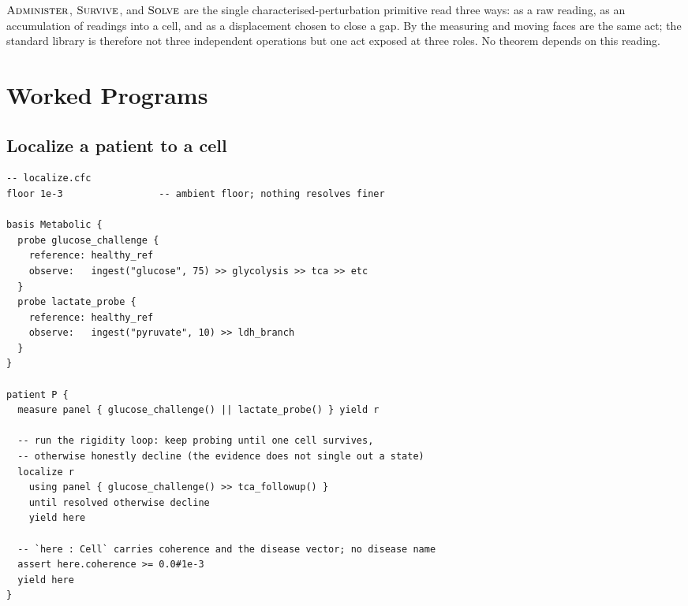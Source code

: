 \begin{remark}
\label{cfc:rem:one-primitive}
$\textsc{Administer}$, $\textsc{Survive}$, and $\textsc{Solve}$ are the single
characterised-perturbation primitive read three ways: as a raw reading, as an
accumulation of readings into a cell, and as a displacement chosen to close a
gap. By  the measuring and moving faces are the same act; the
standard library is therefore not three independent operations but one act
exposed at three roles. No theorem depends on this reading.
\end{remark}

\section{Worked Programs}
\label{cfc:sec:examples}

\subsection{Localize a patient to a cell}

\begin{strip}
\begin{lstlisting}[language=cfc,caption={Diagnosis is localization to a cell, never a label.}]
-- localize.cfc
floor 1e-3                 -- ambient floor; nothing resolves finer

basis Metabolic {
  probe glucose_challenge {
    reference: healthy_ref
    observe:   ingest("glucose", 75) >> glycolysis >> tca >> etc
  }
  probe lactate_probe {
    reference: healthy_ref
    observe:   ingest("pyruvate", 10) >> ldh_branch
  }
}

patient P {
  measure panel { glucose_challenge() || lactate_probe() } yield r

  -- run the rigidity loop: keep probing until one cell survives,
  -- otherwise honestly decline (the evidence does not single out a state)
  localize r
    using panel { glucose_challenge() >> tca_followup() }
    until resolved otherwise decline
    yield here

  -- `here : Cell` carries coherence and the disease vector; no disease name
  assert here.coherence >= 0.0#1e-3
  yield here
}
\end{lstlisting}
\end{strip}

